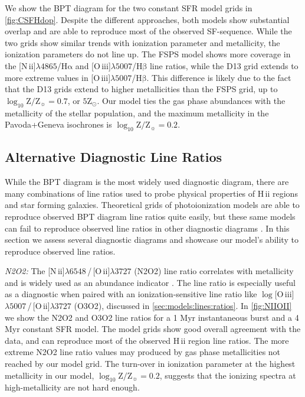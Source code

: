 \documentclass[trackchanges, twocolumn, tighten]{aastex61}
\newcommand{\Fig}[1]{\autoref{fig:#1}}
\newcommand{\Sec}[1]{\autoref{sec:#1}}
\newcommand{\logten}{\ensuremath{\log_{10}}}
\newcommand{\nii}{[N\,{\sc ii}]\xspace}
\newcommand{\oiii}{[O\,{\sc iii}]\xspace}
\newcommand{\oii}{[O\,{\sc ii}]\xspace}
\newcommand{\ha}{\ensuremath{\mathrm{H\alpha}}}
\newcommand{\hb}{\ensuremath{\mathrm{H\beta}}}
\newcommand{\hii}{H\,{\sc ii}\xspace}
\newcommand\lam[1]{\ensuremath{\lambda #1}}
\newcommand{\logZeq}[1]{\ensuremath{\logten \mathrm{Z}/\mathrm{Z}_{\sun} = #1}}
\newcommand\niiha{\nii{}\lam{4865}/\ha{}}
\newcommand\oiiihb{\oiii{}\lam{5007}/\hb{}}
\begin{document}
We show the BPT diagram for the two constant SFR model grids in \Fig{CSFHdop}. Despite the different approaches, both models show substantial overlap and are able to reproduce most of the observed SF-sequence. While the two grids show similar trends with ionization parameter and metallicity, the ionization parameters do not line up. The FSPS model shows more coverage in the \niiha{} and \oiiihb{} line ratios, while the D13 grid extends to more extreme values in \oiiihb{}. This difference is likely due to the fact that the D13 grids extend to higher metallicities than the FSPS grid, up to \logZeq{0.7}, or $5\mathrm{Z}_{\odot}$. Our model ties the gas phase abundances with the metallicity of the stellar population, and the maximum metallicity in the Pavoda+Geneva isochrones is \logZeq{0.2}.

\subsection{Alternative Diagnostic Line Ratios}\label{sec:models:discussion}

While the BPT diagram is the most widely used diagnostic diagram, there are many combinations of line ratios used to probe physical properties of \hii regions and star forming galaxies. Theoretical grids of photoionization models are able to reproduce observed BPT diagram line ratios quite easily, but these same models can fail to reproduce observed line ratios in other diagnostic diagrams \citep[e.g., ][]{Telford16}. In this section we assess several diagnostic diagrams and showcase our model's ability to reproduce observed line ratios.

{\it N2O2:} The \nii\lam{6548}\,/\,\oii\lam{3727} (N2O2) line ratio correlates with metallicity and is widely used as an abundance indicator \citep{Levesque10, Dopita00, VO87}. The line ratio is especially useful as a diagnostic when paired with an ionization-sensitive line ratio like $\log$\oiii\lam{5007}\,/\,\oii\lam{3727} (O3O2), discussed in \Sec{models:lines:ratios}. In \Fig{NIIOII} we show the N2O2 and O3O2 line ratios for a 1 Myr instantaneous burst and a 4 Myr constant SFR model. The model grids show good overall agreement with the data, and can reproduce most of the observed \hii region line ratios. The more extreme N2O2 line ratio values may produced by gas phase metallicities not reached by our model grid. The turn-over in ionization parameter at the highest metallicity in our model, \logZeq{0.2}, suggests that the ionizing spectra at high-metallicity are not hard enough.
\end{document}
